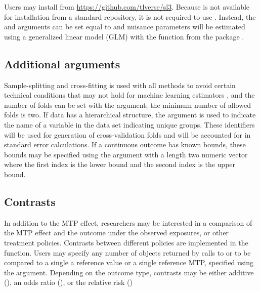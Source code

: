 \documentclass[]{jss}
\begin{document}
Users may install  from \url{https://github.com/tlverse/sl3}.
Because  is not available for installation from a standard
repository, it is not required to use . Instead, the
 and  arguments can be set equal
to  and nuisance parameters will be estimated using a
generalized linear model (GLM) with the  function from the
 package \citep{rcore}.

\hypertarget{additional-arguments}{%
\subsection{Additional arguments}\label{additional-arguments}}

Sample-splitting and cross-fitting is used with all methods to avoid
certain technical conditions that may not hold for machine learning
estimators \citep{zhengCrossValidatedTargetedMinimumLossBased2011b,
  chernozhukovDoubleDebiasedMachine2018}, and the number of folds can
be set with the  argument; the minimum number of allowed
folds is two.  If data has a hierarchical structure, the 
argument is used to indicate the name of a variable in the data set
indicating unique groups. These identifiers will be used for
generation of cross-validation folds and will be accounted for in
standard error calculations. If a continuous outcome has known bounds,
these bounds may be specified using the  argument with a
length two numeric vector where the first index is the lower bound and
the second index is the upper bound.

\hypertarget{contrasts}{%
\subsection{Contrasts}\label{contrasts}}

In addition to the MTP effect, researchers may be interested in a
comparison of the MTP effect and the outcome under the observed
exposures, or other treatment policies. Contrasts between different
policies are implemented in the  function. Users
may specify any number of objects returned by calls to
 or  to be compared to a single a
reference value or a single reference MTP, specified using the
 argument.  Depending on the outcome type, contrasts may be
either additive (), an odds ratio (), or the relative risk ()
\end{document}
